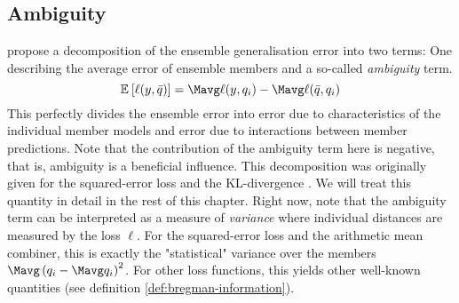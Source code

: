 \documentclass[../main.tex]{subfiles}
\begin{document}
\subsection{Ambiguity}

\cite{krogh_NeuralNetworkEnsembles_1995} propose a decomposition of the ensemble generalisation error into two terms: One describing the average error of ensemble members and a so-called \textit{ambiguity} term. 
$$
\mathbb{E}_{}\left[ \ell(y, \bar{q}) \right] = \Mavg \ell(y, q_{i}) - \Mavg \ell(\bar{q}, q_{i})
$$
This perfectly divides the ensemble error into error due to characteristics of the individual member models and error due to interactions between member predictions. Note that the contribution of the ambiguity term here is negative, that is, ambiguity is a beneficial influence. 
This decomposition was originally given for the squared-error loss \cite{krogh_NeuralNetworkEnsembles_1995} and the KL-divergence \cite{todo}. We will treat this quantity in detail in the rest of this chapter. Right now, note that the ambiguity term can be interpreted as a measure of \textit{variance} where individual distances are measured by the loss $\ell$. For the squared-error loss and the arithmetic mean combiner, this is exactly the "statistical" variance over the members $\Mavg \left(q_{i} - \Mavg q_{i}\right)^2$. For other loss functions, this yields other well-known quantities (see definition \ref{def:bregman-information}).
\end{document}
